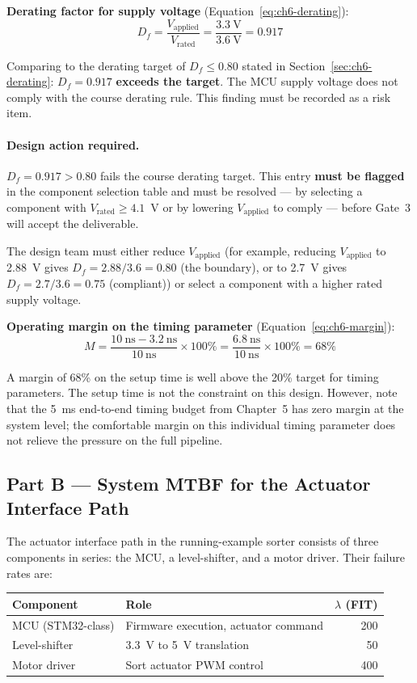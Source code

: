 \textbf{Derating factor for supply voltage} (Equation~\ref{eq:ch6-derating}):
\[
  D_f = \frac{V_{\text{applied}}}{V_{\text{rated}}} = \frac{3.3~\mathrm{V}}{3.6~\mathrm{V}} = 0.917
\]

Comparing to the derating target of $D_f \leq 0.80$ stated in Section~\ref{sec:ch6-derating}: $D_f = 0.917$ \textbf{exceeds the target}.
The MCU supply voltage does not comply with the course derating rule.
This finding must be recorded as a risk item.

\paragraph{Design action required.}
$D_f = 0.917 > 0.80$ fails the course derating target.
This entry \textbf{must be flagged} in the component selection table and must be resolved --- by selecting a component with $V_{\text{rated}} \geq 4.1$~V or by lowering $V_{\text{applied}}$ to comply --- before Gate~3 will accept the deliverable.

The design team must either reduce $V_{\text{applied}}$ (for example, reducing $V_{\text{applied}}$ to 2.88~V gives $D_f = 2.88/3.6 = 0.80$ (the boundary), or to 2.7~V gives $D_f = 2.7/3.6 = 0.75$ (compliant)) or select a component with a higher rated supply voltage.

\textbf{Operating margin on the timing parameter} (Equation~\ref{eq:ch6-margin}):
\[
  M = \frac{10~\mathrm{ns} - 3.2~\mathrm{ns}}{10~\mathrm{ns}} \times 100\% = \frac{6.8~\mathrm{ns}}{10~\mathrm{ns}} \times 100\% = 68\%
\]

A margin of 68\% on the setup time is well above the 20\% target for timing parameters.
The setup time is not the constraint on this design.
However, note that the 5~ms end-to-end timing budget from Chapter~5 has zero margin at the system level; the comfortable margin on this individual timing parameter does not relieve the pressure on the full pipeline.

\subsection{Part B — System MTBF for the Actuator Interface Path}
\label{sec:ch6-worked-b}

The actuator interface path in the running-example sorter consists of three components in series: the MCU, a level-shifter, and a motor driver.
Their failure rates are:

\begin{center}
\begin{tabular}{llr}
  \hline
  Component & Role & $\lambda$ (FIT) \\
  \hline
  MCU (STM32-class) & Firmware execution, actuator command & 200 \\
  Level-shifter & 3.3~V to 5~V translation & 50 \\
  Motor driver & Sort actuator PWM control & 400 \\
  \hline
\end{tabular}
\end{center}

